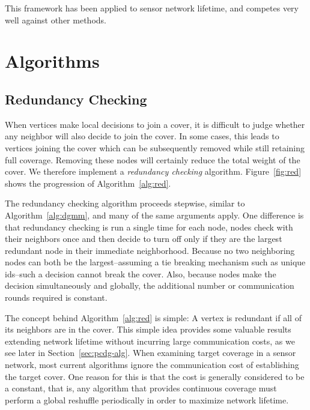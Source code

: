 \documentclass[conference, 10pt]{IEEEtran}
\begin{document}
This framework has been applied to sensor network lifetime, and competes very well against other methods\cite{Dhawan:hipc-09}.

\section{Algorithms}
\label{sec:algorithms}

\subsection{Redundancy Checking}
\label{sec:redundant}
When vertices make local decisions to join a cover, it is difficult to judge whether any neighbor will also decide to join the cover. In some cases, this leads to vertices joining the cover which can be subsequently removed while still retaining full coverage. Removing these nodes will certainly reduce the total weight of the cover. We therefore implement a {\em redundancy checking} algorithm. Figure~\ref{fig:red} shows the progression of Algorithm~\ref{alg:red}.

 



The redundancy checking algorithm proceeds stepwise, similar to Algorithm~\ref{alg:dgmm}, and many of the same arguments apply. One difference is that redundancy checking is run a single time for each node, nodes check with their neighbors once and then decide to turn off only if they are the largest redundant node in their immediate neighborhood. Because no two neighboring nodes can both be the largest--assuming a tie breaking mechanism such as unique ids--such a decision cannot break the cover. Also, because nodes make the decision simultaneously and globally, the additional number or communication rounds required is constant.

The concept behind Algorithm~\ref{alg:red} is simple: A vertex is redundant if all of its neighbors are in the cover. This simple idea provides some valuable results extending network lifetime without incurring large communication costs, as we see later in Section~\ref{sec:pcdg-alg}. When examining target coverage in a sensor network, most current algorithms ignore the communication cost of establishing the target cover\cite{1514028}. One reason for this is that the cost is generally considered to be a constant, that is, any algorithm that provides continuous coverage must perform a global reshuffle periodically in order to maximize network lifetime. 
\end{document}
